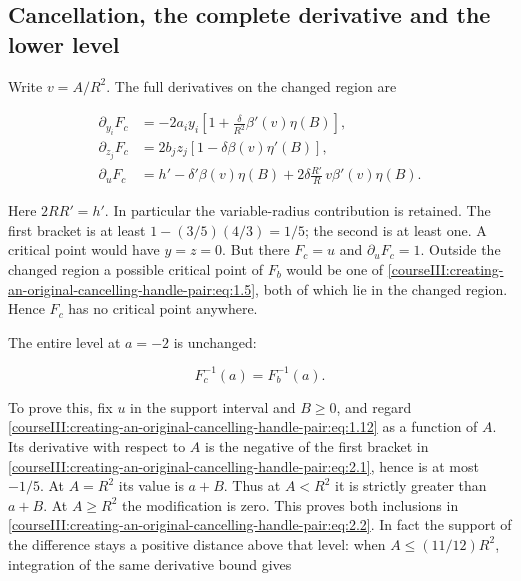 \subsection{Cancellation, the complete derivative and the lower level}
\label{courseIII:creating-an-original-cancelling-handle-pair:pair-cancelled-model}

\label{courseIII:creating-an-original-cancelling-handle-pair:section-2}\label{courseIII:pair-creation:2}

Write \(v=A/R^2\). The full derivatives on the changed region are

\begin{equation}
\begin{aligned}
 \partial_{y_i}F_c&=-2a_i y_i
       \left[1+\frac{\delta}{R^2}\beta'(v)\eta(B)\right],\\
 \partial_{z_j}F_c&=2b_j z_j
       \left[1-\delta\beta(v)\eta'(B)\right],\\
 \partial_uF_c&=h'-\delta'\beta(v)\eta(B)
       +2\delta\frac{R'}R\,v\beta'(v)\eta(B).
\end{aligned}
 \label{courseIII:creating-an-original-cancelling-handle-pair:eq:2.1}
\end{equation}

Here \(2RR'=h'\). In particular the variable-radius contribution is retained. The first bracket is at least \(1-(3/5)(4/3)=1/5\); the second is at least one. A critical point would have \(y=z=0\). But there \(F_c=u\) and \(\partial_uF_c=1\). Outside the changed region a possible critical point of \(F_b\) would be one of \eqref{courseIII:creating-an-original-cancelling-handle-pair:eq:1.5}, both of which lie in the changed region. Hence \(F_c\) has no critical point anywhere.

The entire level at \(a=-2\) is unchanged:

\begin{equation}
F_c^{-1}(a)=F_b^{-1}(a).
 \label{courseIII:creating-an-original-cancelling-handle-pair:eq:2.2}
\end{equation}

To prove this, fix \(u\) in the support interval and \(B\geq0\), and regard \eqref{courseIII:creating-an-original-cancelling-handle-pair:eq:1.12} as a function of \(A\). Its derivative with respect to \(A\) is the negative of the first bracket in \eqref{courseIII:creating-an-original-cancelling-handle-pair:eq:2.1}, hence is at most \(-1/5\). At \(A=R^2\) its value is \(a+B\). Thus at \(A<R^2\) it is strictly greater than \(a+B\). At \(A\geq R^2\) the modification is zero. This proves both inclusions in \eqref{courseIII:creating-an-original-cancelling-handle-pair:eq:2.2}. In fact the support of the difference stays a positive distance above that level: when \(A\leq(11/12)R^2\), integration of the same derivative bound gives

